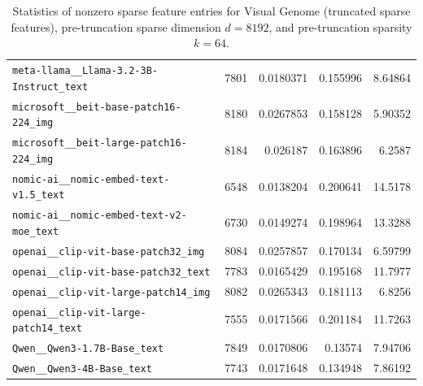 \begin{table}[htbp]
{\begin{tabular}{lrrrr}
\texttt{meta-llama\_\_Llama-3.2-3B-Instruct\_text} & 7801 & 0.0180371 & 0.155996 & 8.64864 \\
\texttt{microsoft\_\_beit-base-patch16-224\_img} & 8180 & 0.0267853 & 0.158128 & 5.90352 \\
\texttt{microsoft\_\_beit-large-patch16-224\_img} & 8184 & 0.026187 & 0.163896 & 6.2587 \\
\texttt{nomic-ai\_\_nomic-embed-text-v1.5\_text} & 6548 & 0.0138204 & 0.200641 & 14.5178 \\
\texttt{nomic-ai\_\_nomic-embed-text-v2-moe\_text} & 6730 & 0.0149274 & 0.198964 & 13.3288 \\
\texttt{openai\_\_clip-vit-base-patch32\_img} & 8084 & 0.0257857 & 0.170134 & 6.59799 \\
\texttt{openai\_\_clip-vit-base-patch32\_text} & 7783 & 0.0165429 & 0.195168 & 11.7977 \\
\texttt{openai\_\_clip-vit-large-patch14\_img} & 8082 & 0.0265343 & 0.181113 & 6.8256 \\
\texttt{openai\_\_clip-vit-large-patch14\_text} & 7555 & 0.0171566 & 0.201184 & 11.7263 \\
\texttt{Qwen\_\_Qwen3-1.7B-Base\_text} & 7849 & 0.0170806 & 0.13574 & 7.94706 \\
\texttt{Qwen\_\_Qwen3-4B-Base\_text} & 7743 & 0.0171648 & 0.134948 & 7.86192 \\
\bottomrule
\end{tabular}
}%
\caption{Statistics of nonzero sparse feature entries for Visual Genome (truncated sparse features), pre-truncation sparse dimension $d=8192$, and pre-truncation sparsity $k=64$.}
\label{tab:sparse-feature-entries-visual-genome-truncated-d8192-k64}
\end{table}
